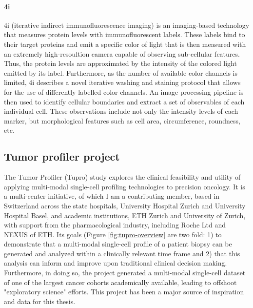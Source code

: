\paragraph{4i} %
4i (iterative indirect immunofluorescence imaging) \cite{gut2018}
is an imaging-based technology that measures protein levels with immunofluorescent labels.
These labels bind to their target proteins and emit a specific color of light
that is then measured with an extremely high-resoultion camera capable of observing sub-cellular features.
Thus, the protein levels are approximated by the intensity of the colored light emitted by its label.
Furthermore, as the number of available color channels is limited,
4i describes a novel iterative washing and staining protocol that allows for the use of differently labelled color channels.
An image processing pipeline is then used to identify cellular boundaries and extract a set of observables of each individual cell.
These observations include not only the intensity levels of each marker, but morphological features such as cell area, circumference, roundness, etc.

\subsection{Tumor profiler project}
The Tumor Profiler (Tupro) study \cite{irmisch2021} explores the clinical feasibility and utility of applying multi-modal single-cell profiling technologies to precision oncology.
It is a multi-center initiative, of which I am a contributing member, based in Switzerland across the state hospitals, University Hospital Zurich and University Hospital Basel, and academic institutions, ETH Zurich and University of Zurich, with support from the pharmacological industry, including Roche Ltd and NEXUS of ETH.
Its goals (Figure \ref{fig:tupro-overview} are two fold:
1) to demonstrate that a multi-modal single-cell profile of a patient biopsy can be generated and analyzed within a clinically relevant time frame
and 2) that this analysis can inform and improve upon traditional clinical decision making.
Furthermore, in doing so, the project generated a multi-modal single-cell dataset of one of the largest cancer cohorts academically available,
leading to offshoot "exploratory science" efforts.
This project has been a major source of inspiration and data for this thesis.


